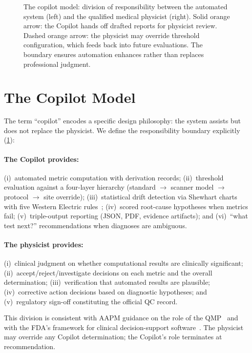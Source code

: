 \documentclass[11pt]{article}
\begin{document}
\begin{figure}[t]
\begin{tikzpicture}
\end{tikzpicture}
\caption{%
  The copilot model: division of responsibility between the automated
  system (left) and the qualified medical physicist (right).
  Solid orange arrow: the Copilot hands off drafted reports for
  physicist review.
  Dashed orange arrow: the physicist may override threshold
  configuration, which feeds back into future evaluations.
  The boundary ensures automation enhances rather than replaces
  professional judgment.
}
\label{fig:copilot_model}
\end{figure}


\section{The Copilot Model}
\label{sec:copilot_model}

The term ``copilot'' encodes a specific design philosophy: the
system assists but does not replace the physicist.
We define the responsibility boundary explicitly
(\cref{fig:copilot_model}):

\paragraph{The Copilot provides:}
(i)~automated metric computation with derivation records;
(ii)~threshold evaluation against a four-layer hierarchy (standard
$\to$ scanner model $\to$ protocol $\to$ site override);
(iii)~statistical drift detection via Shewhart charts with five
Western Electric rules~\cite{shewhart1931,western_electric_1956};
(iv)~scored root-cause hypotheses when metrics fail;
(v)~triple-output reporting (JSON, PDF, evidence artifacts); and
(vi)~``what test next?'' recommendations when diagnoses are
ambiguous.

\paragraph{The physicist provides:}
(i)~clinical judgment on whether computational results are
clinically significant;
(ii)~accept/reject/investigate decisions on each metric and the
overall determination;
(iii)~verification that automated results are plausible;
(iv)~corrective action decisions based on diagnostic hypotheses;
and (v)~regulatory sign-off constituting the official QC record.

This division is consistent with AAPM guidance on the role of the
QMP~\cite{aapm_tg233} and with the FDA's framework for clinical
decision-support software~\cite{samd_fda}.
The physicist may override any Copilot determination; the Copilot's
role terminates at recommendation.
\end{document}
